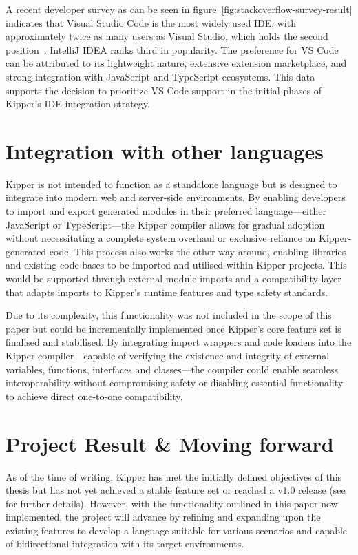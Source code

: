A recent developer survey as can be seen in figure~\ref{fig:stackoverflow-survey-result} indicates that Visual Studio Code is the most widely used IDE, with approximately twice as many users as Visual Studio, which holds the second position~\cite{stackoverflow2024}. IntelliJ IDEA ranks third in popularity. The preference for VS Code can be attributed to its lightweight nature, extensive extension marketplace, and strong integration with JavaScript and TypeScript ecosystems. This data supports the decision to prioritize VS Code support in the initial phases of Kipper's IDE integration strategy.

\section{Integration with other languages}

Kipper is not intended to function as a standalone language but is designed to integrate into modern web and server-side environments. By enabling developers to import and export generated modules in their preferred language—either JavaScript or TypeScript—the Kipper compiler allows for gradual adoption without necessitating a complete system overhaul or exclusive reliance on Kipper-generated code. This process also works the other way around, enabling libraries and existing code bases to be imported and utilised within Kipper projects. This would be supported through external module imports and a compatibility layer that adapts imports to Kipper's runtime features and type safety standards.

Due to its complexity, this functionality was not included in the scope of this paper but could be incrementally implemented once Kipper's core feature set is finalised and stabilised. By integrating import wrappers and code loaders into the Kipper compiler—capable of verifying the existence and integrity of external variables, functions, interfaces and classes—the compiler could enable seamless interoperability without compromising safety or disabling essential functionality to achieve direct one-to-one compatibility.

\section{Project Result \& Moving forward}

As of the time of writing, Kipper has met the initially defined objectives of this thesis but has not yet achieved a stable feature set or reached a v1.0 release (see  for further details). However, with the functionality outlined in this paper now implemented, the project will advance by refining and expanding upon the existing features to develop a language suitable for various scenarios and capable of bidirectional integration with its target environments.

